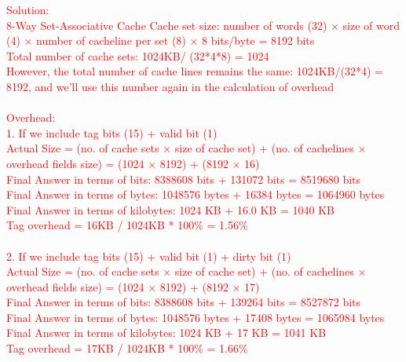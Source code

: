 \documentclass[a4paper,10pt]{article}
\begin{document}
\begin{enumerate}
\noindent\fbox
{%
    \parbox{\linewidth}
    {%
    \textcolor{red}{
    Solution: \\
8-Way Set-Associative Cache
Cache set size: number of words (32) × size of word (4) × number of cacheline per set (8) × 8 bits/byte = 8192 bits\\
Total number of cache sets: 1024KB/ (32*4*8) = 1024\\
However, the total number of cache lines remains the same: 1024KB/(32*4) = 8192, and we’ll use this number again in the calculation of overhead \\
\\
Overhead:
\\
1. If we include tag bits (15) + valid bit (1)\\
Actual Size = (no. of cache sets × size of cache set) + (no. of cachelines × overhead fields size) = (1024 × 8192) + (8192 × 16)\\
Final Answer in terms of bits: 8388608 bits + 131072 bits = 8519680 bits\\
Final Answer in terms of bytes: 1048576 bytes + 16384 bytes = 1064960 bytes\\
Final Answer in terms of kilobytes: 1024 KB + 16.0 KB = 1040 KB\\
Tag overhead = 16KB / 1024KB * 100\% = 1.56\%\\
 \\
2. If we include tag bits (15) + valid bit (1) + dirty bit (1)\\
Actual Size = (no. of cache sets × size of cache set) + (no. of cachelines × overhead fields size) = (1024 × 8192) + (8192 × 17)\\
Final Answer in terms of bits: 8388608 bits + 139264 bits = 8527872 bits\\
Final Answer in terms of bytes: 1048576 bytes + 17408 bytes = 1065984 bytes\\
Final Answer in terms of kilobytes: 1024 KB + 17 KB = 1041 KB\\
Tag overhead = 17KB / 1024KB * 100\% = 1.66\%\\
}
    }%
}


\end{enumerate}
\end{document}
